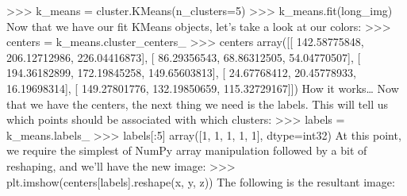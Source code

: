>>> k_means = cluster.KMeans(n_clusters=5)
>>> k_means.fit(long_img)
Now that we have our fit KMeans objects, let's take a look at our colors:
>>> centers = k_means.cluster_centers_
>>> centers
array([[ 142.58775848, 206.12712986, 226.04416873],
[ 86.29356543, 68.86312505, 54.04770507],
[ 194.36182899, 172.19845258, 149.65603813],
[ 24.67768412, 20.45778933, 16.19698314],
[ 149.27801776, 132.19850659, 115.32729167]])
How it works…
Now that we have the centers, the next thing we need is the labels. This will tell us which
points should be associated with which clusters:
>>> labels = k_means.labels_
>>> labels[:5]
array([1, 1, 1, 1, 1], dtype=int32)
At this point, we require the simplest of NumPy array manipulation followed by a bit of
reshaping, and we'll have the new image:
>>> plt.imshow(centers[labels].reshape(x, y, z))
The following is the resultant image:
